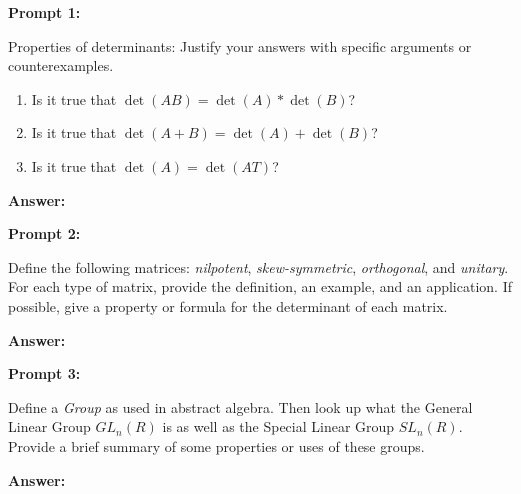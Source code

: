 \documentclass[10pt,letterpaper,final]{report}
\begin{document}
\begin{center}
  \vline
\end{center}

\medskip
\noindent\textbf{Prompt 1:}
\medskip

Properties of determinants: Justify your answers with specific arguments or counterexamples.

\begin{enumerate}
  \item Is it true that $\det(AB) = \det(A)*\det(B)$?
  \item Is it true that $\det(A+B) = \det(A) + \det(B)$?
  \item Is it true that $\det(A) = \det(AT)$?
\end{enumerate}

\medskip
\noindent\textbf{Answer:}
\medskip

\pagebreak
\noindent\textbf{Prompt 2:}
\medskip

Define the following matrices: \emph{nilpotent}, \emph{skew-symmetric}, \emph{orthogonal}, and \emph{unitary}.  For each type of matrix, provide the definition, an example, and an application.  If possible, give a property or formula for the determinant of each matrix.

\medskip
\noindent\textbf{Answer:}
\medskip


\pagebreak
\noindent\textbf{Prompt 3:}
\medskip

Define a \emph{Group} as used in abstract algebra. Then look up what the General Linear Group $GL_n(R)$ is as well as the Special Linear Group $SL_n(R)$. Provide a brief summary of some properties or uses of these groups.

\medskip
\noindent\textbf{Answer:}
\medskip
\end{document}
